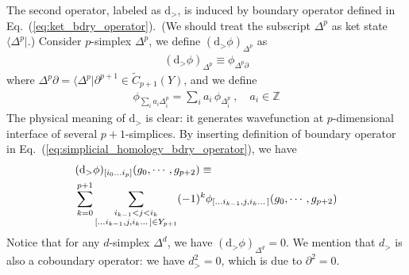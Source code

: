 \documentclass[reprint,amsmath,amssymb,aps,pra,]{revtex4-1}
\newcommand{\dd}{\mathrm{d}} %
\newcommand{\ZZ}{\mathbb{Z}} %
\begin{document}
The second operator, labeled as $\dd_>$, is induced by boundary operator defined in Eq.~(\ref{eq:ket_bdry_operator}).~(We should treat the subscript $\Delta^p$ as ket state $\langle\Delta^p|$.)
Consider $p$-simplex $\Delta^p$, we define $(\dd_>\phi)_{\Delta^p}$ as
\begin{align}
  (\dd_>\phi)_{\Delta^p}\equiv \phi_{\Delta^p\partial}
  \label{eq:right_coboundary}
\end{align}
where $\Delta^p\partial=\langle\Delta^p|\partial^{p+1}\in \widetilde{C}_{p+1}(Y)$, and we define
\begin{align}
  \phi_{\sum_i a_i\Delta^p_i}=\sum_i a_i\,\phi_{\Delta^p_i}~,\quad a_i\in\ZZ
  \label{}
\end{align}
The physical meaning of $\dd_>$ is clear:
it generates wavefunction at $p$-dimensional interface of several $p+1$-simplices.
By inserting definition of boundary operator in Eq.~(\ref{eq:simplicial_homology_bdry_operator}), we have
\begin{align}
  &(\dd_>\phi)_{[i_0\dots i_{p}]}(g_0,\cdots,g_{p+2})\equiv\notag\\
  &\sum_{k=0}^{p+1}\sum_{\substack{i_{k-1}<j<i_k\\ [\dots i_{k-1},j,i_{k}\dots]\in Y_{p+1}}}(-1)^k\phi_{[\dots i_{k-1},j,i_{k}\dots]}(g_0,\cdots,g_{p+2})
\end{align}
Notice that for any $d$-simplex $\Delta^d$, we have $(\dd_>\phi)_{\Delta^d}=0$.
We mention that $d_>$ is also a coboundary operator: we have $d_>^2=0$, which is due to $\partial^2=0$.
\end{document}
